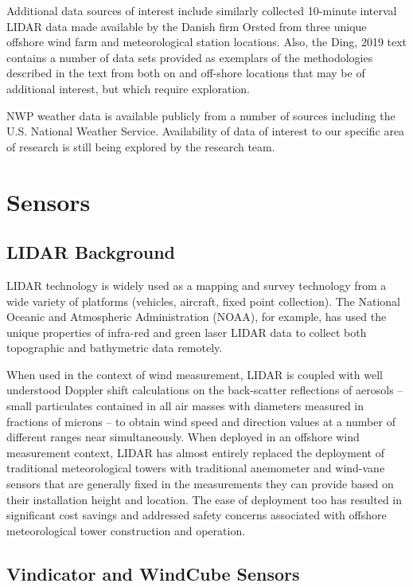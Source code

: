 \documentclass{llncs}
\begin{document}
Additional data sources of interest include similarly collected 10-minute interval LIDAR data made available by the Danish firm Orsted from three unique offshore wind farm and meteorological station locations. \cite{Moore} Also, the Ding, 2019 text contains a number of data sets provided as exemplars of the methodologies described in the text from both on and off-shore locations that may be of additional interest, but which require exploration. \cite{Ding2019}

NWP weather data is available publicly from a number of sources including the U.S. National Weather Service. Availability of data of interest to our specific area of research is still being explored by the research team.

\section{Sensors}

\subsection{LIDAR Background} LIDAR technology is widely used as a mapping and survey technology from a wide variety of platforms (vehicles, aircraft, fixed point collection). The National Oceanic and Atmospheric Administration (NOAA), for example, has used the unique properties of infra-red and green laser LIDAR data to collect both topographic and bathymetric data remotely. \cite{noaa2012}

When used in the context of wind measurement, LIDAR is coupled with well understood Doppler shift calculations on the back-scatter reflections of aerosols -- small particulates contained in all air masses with diameters measured in fractions of microns -- to obtain wind speed and direction values at a number of different ranges near simultaneously. \cite{doppler_lidar} When deployed in an offshore wind measurement context, LIDAR has almost entirely replaced the deployment of traditional meteorological towers with traditional anemometer and wind-vane sensors that are generally fixed in the measurements they can provide based on their installation height and location. The ease of deployment too has resulted in significant cost savings and addressed safety concerns associated with offshore meteorological tower construction and operation. \cite{leosphere_2017}

\subsection{Vindicator and WindCube Sensors}
\end{document}
